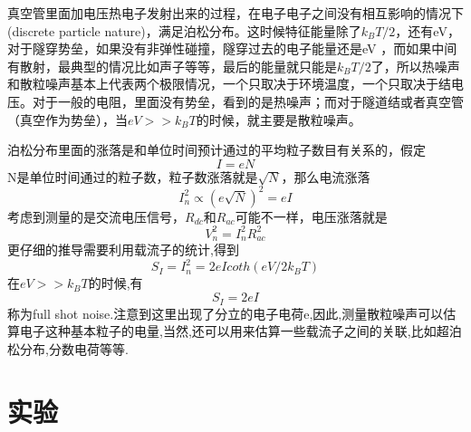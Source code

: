 \documentclass[a4paper]{article}
\begin{document}
真空管里面加电压热电子发射出来的过程，在电子电子之间没有相互影响的情况下(discrete particle nature)，满足泊松分布。这时候特征能量除了$k_B T/2$，还有eV，对于隧穿势垒，如果没有非弹性碰撞，隧穿过去的电子能量还是eV ，而如果中间有散射，最典型的情况比如声子等等，最后的能量就只能是$k_B T/2$了，所以热噪声和散粒噪声基本上代表两个极限情况，一个只取决于环境温度，一个只取决于结电压。对于一般的电阻，里面没有势垒，看到的是热噪声；而对于隧道结或者真空管（真空作为势垒），当$eV>>k_B T$的时候，就主要是散粒噪声。

泊松分布里面的涨落是和单位时间预计通过的平均粒子数目有关系的，假定
\begin{equation}
    I=eN
\end{equation}
N是单位时间通过的粒子数，粒子数涨落就是$\sqrt{N}$，那么电流涨落
\begin{equation}
    I_n^2\propto\left(e\sqrt{N}\right)^2=eI
\end{equation}
考虑到测量的是交流电压信号，$R_{dc}$和$R_{ac}$可能不一样，电压涨落就是
\begin{equation}
    V_n^2=I_n^2R_{ac}^2
\end{equation}
更仔细的推导需要利用载流子的统计,得到
\begin{equation}
    S_I=I_n^2=2eIcoth(eV/2k_B T)
\end{equation}
在$eV>>k_BT$的时候,有
\begin{equation}
    S_I= 2eI
\end{equation}
称为full shot noise.注意到这里出现了分立的电子电荷e,因此,测量散粒噪声可以估算电子这种基本粒子的电量,当然,还可以用来估算一些载流子之间的关联,比如超泊松分布,分数电荷等等.
\newpage
\section{实验} \label{experiment}%
\end{document}

